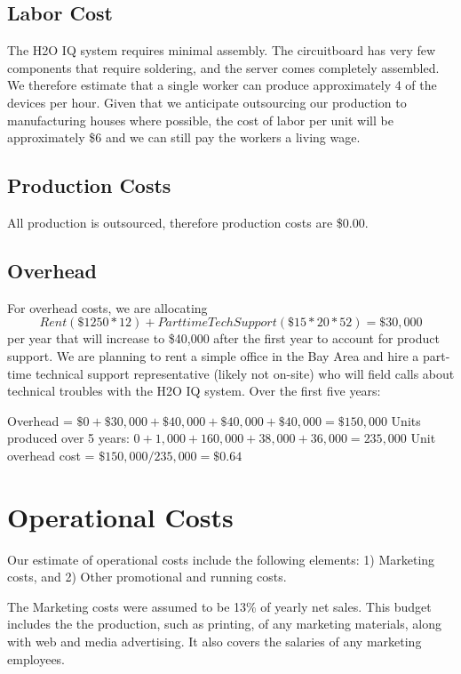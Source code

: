 \documentclass[11pt]{article}
\begin{document}
\subsection{Labor Cost}

The H2O IQ system requires minimal assembly.  The circuitboard has very few components that require soldering, and the server comes completely assembled.  We therefore estimate that a single worker can produce approximately 4 of the devices per hour.  Given that we anticipate outsourcing our production to manufacturing houses where possible, the cost of labor per unit will be approximately \$6 and we can still pay the workers a living wage.

\subsection{Production Costs}

All production is outsourced, therefore production costs are \$0.00.

\subsection{Overhead}

For overhead costs, we are allocating $$Rent (\$1250 * 12) + Part time Tech Support (\$15*20*52) = \$30,000$$ per year that will increase to \$40,000 after the first year to account for product support.  We are planning to rent a simple office in the Bay Area and hire a part-time technical support representative (likely not on-site) who will field calls about technical troubles with the H2O IQ system. Over the first five years:

Overhead = $\$0 + \$30,000 + \$40,000 + \$40,000 + \$40,000 = \$150,000$
Units produced over 5 years: $0 + 1,000 + 160,000 + 38,000 + 36,000 = 235,000$
Unit overhead cost = $\$150,000/235,000 = \$0.64$

\section{Operational Costs}

Our estimate of operational costs include the following elements: 1) Marketing costs, and 2) Other promotional and running costs.

The Marketing costs were assumed to be 13\% of yearly net sales. This budget includes the the production, such as printing, of any marketing materials, along with web and media advertising. It also covers the salaries of any marketing employees.
\end{document}
